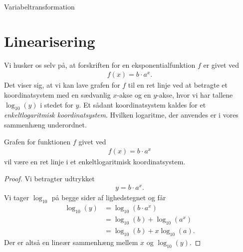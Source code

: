 \begin{center}
	\Huge
	Variabeltransformation
\end{center}

\section*{Linearisering}

Vi husker os selv på, at forskriften for en eksponentialfunktion $f$ er givet ved
\begin{align*}
	f(x) = b\cdot a^x.
\end{align*}
Det viser sig, at vi kan lave grafen for $f$ til en ret linje ved at betragte et koordinatsystem med en sædvanlig $x$-akse og en $y$-akse, hvor vi har tallene $\log_{10}(y)$ i stedet for $y$. Et sådant koordinatsystem kaldes for et \textit{enkeltlogaritmisk koordinatsystem}. Hvilken logaritme, der anvendes er i vores sammenhæng underordnet.
\begin{setn}
	Grafen for funktionen $f$ givet ved
	\begin{align*}
		f(x) = b\cdot a^x
	\end{align*}
	vil være en ret linje i et enkeltlogaritmisk koordinatsystem.
\end{setn}
\begin{proof}
	Vi betragter udtrykket
	\begin{align*}
		y = b\cdot a^x.
	\end{align*}
	Vi tager $\log_{10}$ på begge sider af lighedstegnet og får
	\begin{align*}
		\log_{10}(y) &= \log_{10}(b\cdot a^x)\\
		&= \log_{10}(b) + \log_{10}(a^x)\\
		&= \log_{10}(b) + x\log_{10}(a).
	\end{align*}
	Der er altså en lineær sammenhæng mellem $x$ og $\log_{10}(y)$. 
\end{proof}

